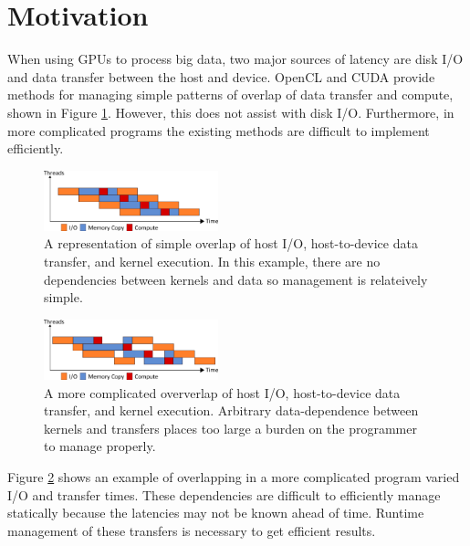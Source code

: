 \section{Motivation}

When using GPUs to process big data, two major sources of latency are disk I/O
and data transfer between the host and device. OpenCL and CUDA provide methods
for managing simple patterns of overlap of data transfer and compute, shown in
Figure \ref{fig:ord}. However, this does not assist with disk I/O.
Furthermore, in more complicated programs the existing methods are difficult to
implement efficiently. 

\begin{figure}
  \centering
    \includegraphics[width=0.45\textwidth]{fig/ord.png}
  \caption{A representation of simple overlap of host I/O, host-to-device data
           transfer, and kernel execution. In this example, there are no
           dependencies between kernels and data so management is relateively
           simple.}
  \label{fig:ord}
\end{figure}

\begin{figure}
  \centering
    \includegraphics[width=0.45\textwidth]{fig/unord.png}
  \caption{A more complicated oververlap of host I/O, host-to-device data
           transfer, and kernel execution. Arbitrary data-dependence between
           kernels and transfers places too large a burden on the programmer
           to manage properly.}
  \label{fig:unord}
\end{figure}

Figure \ref{fig:unord} shows an example of overlapping in a more complicated
program varied I/O and transfer times. These dependencies are difficult to
efficiently manage statically because the latencies may not be known ahead of
time. Runtime management of these transfers is necessary to get efficient
results.

 

